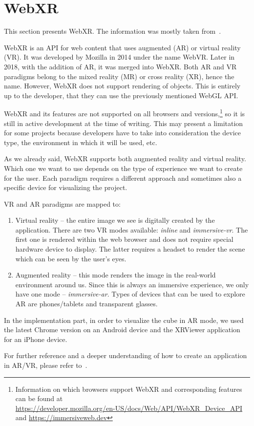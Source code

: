 \section{WebXR}\label{sec:webxr}
This section presents WebXR. The information was mostly taken from~\citep{webapismdnwebxr}.

WebXR is an API for web content that uses augmented (AR) or virtual reality (VR). It was developed by Mozilla in 2014 under the name WebVR.
Later in 2018, with the addition of AR, it was merged into WebXR. Both AR and VR paradigms belong to the mixed reality (MR) or cross
reality (XR), hence the name. However, WebXR does not support rendering of objects. This is entirely up to the developer, that they can use the previously mentioned WebGL API\@.

WebXR and its features are not supported on all browsers and versions,\footnote{Information on which browsers support
WebXR and corresponding features can be found at \\ \url{https://developer.mozilla.org/en-US/docs/Web/API/WebXR_Device_API} and
\url{https://immersiveweb.dev}} so it is still in active development at the time of writing. This may present a limitation for some projects
because developers have to take into consideration the device type, the environment in which it will be used, etc.

As we already said, WebXR supports both augmented reality and virtual reality. Which one we want to use depends on the type of experience
we want to create for the user. Each paradigm requires a different approach and sometimes also a specific device for visualizing the project.

VR and AR paradigms are mapped to:
\begin{enumerate}
    \item Virtual reality -- the entire image we see is digitally created by the application. There are two VR modes available: \emph{inline} and
    \emph{immersive-vr}. The first one is rendered within the web browser and does not require special hardware device to display. The latter
    requires a headset to render the scene which can be seen by the user’s eyes.
    \item Augmented reality -- this mode renders the image in the real-world environment around us. Since this is always an immersive
    experience, we only have one mode -- \emph{immersive-ar}. Types of devices that can be used to explore AR are phones/tablets and transparent
    glasses.
\end{enumerate}

In the implementation part, in order to visualize the cube in AR mode, we used the latest Chrome version on an Android device and the
XRViewer application for an iPhone device.

For further reference and a deeper understanding of how to create an application in AR/VR, please refer to~\citep{baruah2021ar}.

